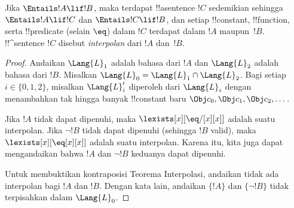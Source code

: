 \documentclass[../../../include/open-logic-section]{subfiles}
\begin{document}


\begin{thm}
Jika $\Entails !A \lif !B$, maka terdapat !!a{sentence} $!C$ sedemikian
sehingga $\Entails !A \lif !C$ dan $\Entails !C \lif !B$, dan setiap
!!{constant}, !!{function}, serta !!{predicate} (selain $\eq$) dalam $!C$
terdapat dalam $!A$ maupun~$!B$. !!^{sentence} $!C$ disebut
\emph{interpolan} dari $!A$ dan~$!B$.
\end{thm}

\begin{proof}
Andaikan $\Lang{L}_1$ adalah bahasa dari $!A$ dan $\Lang{L}_2$ adalah
bahasa dari $!B$. Misalkan $\Lang{L}_0 = \Lang{L}_1 \cap \Lang{L}_2$.
Bagi setiap $i \in \{0, 1, 2 \}$, misalkan $\Lang{L}'_i$ diperoleh dari
$\Lang{L}_i$ dengan menambahkan tak hingga banyak !!{constant} baru
$\Obj c_0, \Obj c_1, \Obj c_2, \dots$.

Jika $!A$ tidak dapat dipenuhi, maka $\lexists[x][\eq/[x][x]]$ adalah suatu
interpolan. Jika $\lnot !B$ tidak dapat dipenuhi (sehingga $!B$ valid), maka
$\lexists[x][\eq[x][x]]$ adalah suatu interpolan. Karena itu, kita juga dapat
mengandaikan bahwa $!A$ dan $\lnot !B$ keduanya dapat dipenuhi.

Untuk membuktikan kontraposisi Teorema Interpolasi, andaikan tidak ada
interpolan bagi $!A$ dan $!B$. Dengan kata lain, andaikan $\{!A\}$ dan
$\{\lnot !B\}$ tidak terpisahkan dalam $\Lang{L}_0$.


\end{proof}
\end{document}
